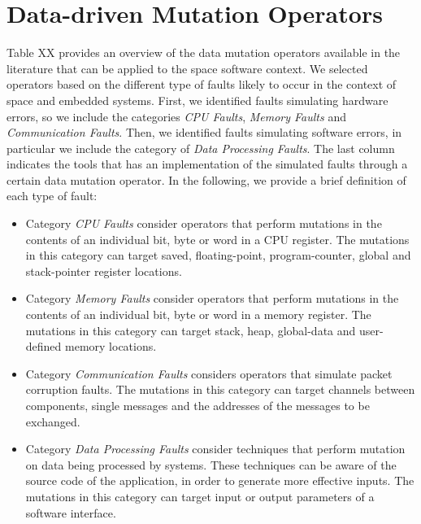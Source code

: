 
\section{Data-driven Mutation Operators}
\label{sec:data_operators}

Table XX provides an overview of the data mutation operators available in the literature that can be applied to the space software context.
We selected operators based on the different type of faults likely to occur in the context of space and embedded systems. 
First, we identified faults simulating hardware errors, so we include the categories \emph{CPU Faults}, \emph{Memory Faults} and \emph{Communication Faults}. Then, we identified faults simulating software errors, in particular we include the category of \emph{Data Processing Faults}. The last column indicates the tools that has an implementation of the simulated faults through a certain data mutation operator. In the following, we provide a brief definition of each type of fault:

\begin{itemize}
	\item Category \emph{CPU Faults} consider operators that perform mutations in the contents of an individual bit, byte or word in a CPU register. The mutations in this category can target saved, floating-point, program-counter, global and stack-pointer register locations. 
	\item Category \emph{Memory Faults} consider operators that perform mutations in the contents of an individual bit, byte or word in a memory register. The mutations in this category can target stack, heap, global-data and user-defined memory locations.
	\item Category \emph{Communication Faults} considers operators that simulate packet corruption faults. The mutations in this category can target channels between components, single messages and the addresses of the messages to be exchanged.
	\item Category \emph{Data Processing Faults} consider techniques that perform mutation on data being processed by systems. These techniques can be aware of the source code of the application, in order to generate more effective inputs. The mutations in this category can target input or output parameters of a software interface.
\end{itemize}




